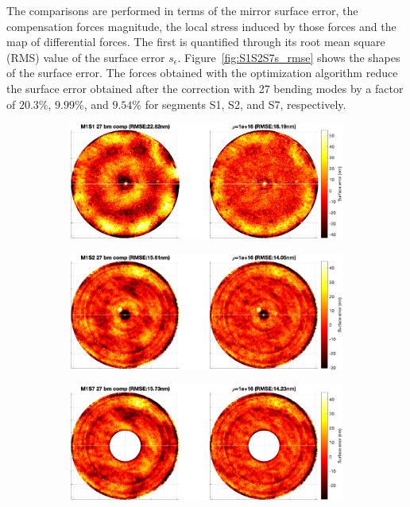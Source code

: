\documentclass{gmto}
\begin{document}
The comparisons are performed in terms of the mirror surface error, the compensation forces magnitude, the local stress induced by those forces and the map of differential forces. The first is quantified through its root mean square (RMS) value of the surface error $s_\epsilon$. Figure~\ref{fig:S1S2S7s_rmse} shows the shapes of the surface error. The forces obtained with the optimization algorithm reduce the surface error obtained after the correction with 27 bending modes by a factor of $20.3$\%, $9.99$\%, and $9.54$\% for segments \textsf{S1}, \textsf{S2}, and \textsf{S7}, respectively.
\begin{figure}[p]
\begin{subfigure}[b]{\textwidth}
\centering
\includegraphics[width=\textwidth]{./pictures/s1_surfaceRMSE.eps}
\end{subfigure}
%
\begin{subfigure}[b]{\textwidth}
\centering
\includegraphics[width=\textwidth]{./pictures/s2_surfaceRMSE.eps}
\end{subfigure}
\begin{subfigure}[b]{\textwidth}
\centering
\includegraphics[width=\textwidth]{./pictures/s7_surfaceRMSE.eps}

\end{subfigure}
\end{figure}
\end{document}
